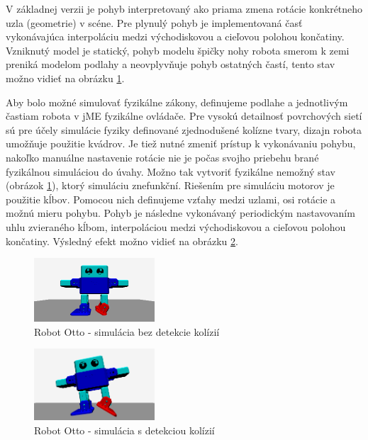 V základnej verzii je pohyb interpretovaný ako priama zmena rotácie konkrétneho uzla (geometrie) v scéne. Pre plynulý pohyb je implementovaná časť vykonávajúca interpoláciu medzi východiskovou a cieľovou polohou končatiny. Vzniknutý model je statický, pohyb modelu špičky nohy robota smerom k zemi preniká modelom podlahy a neovplyvňuje pohyb ostatných častí, tento stav možno vidieť na obrázku \ref{obr:otto-without-collision}.

Aby bolo možné simulovať fyzikálne zákony, definujeme podlahe a jednotlivým častiam robota v jME fyzikálne ovládače. Pre vysokú detailnosť povrchových sietí sú pre účely simulácie fyziky definované zjednodušené kolízne tvary, dizajn robota umožňuje použitie kvádrov. Je tiež nutné zmeniť prístup k vykonávaniu pohybu, nakoľko manuálne nastavenie rotácie nie je počas svojho priebehu brané fyzikálnou simuláciou do úvahy. Možno tak vytvoriť fyzikálne nemožný stav (obrázok \ref{obr:otto-without-collision}), ktorý simuláciu znefunkční. Riešením pre simuláciu motorov je použitie kĺbov. Pomocou nich definujeme vzťahy medzi uzlami, osi rotácie a možnú mieru pohybu. Pohyb je následne vykonávaný periodickým nastavovaním uhlu zvieraného kĺbom, interpoláciou medzi východiskovou a cieľovou polohou končatiny. Výsledný efekt možno vidieť na obrázku \ref{obr:otto-with-collision}.

\begin{figure}
\centerline{\includegraphics[width=0.4\textwidth]{images/otto-without-collision}}
\caption[Robot Otto - simulácia bez detekcie kolízií]{Robot Otto - simulácia bez detekcie kolízií}
\label{obr:otto-without-collision}
\end{figure}

\begin{figure}
\centerline{\includegraphics[width=0.4\textwidth]{images/otto-with-collision}}
\caption[Robot Otto - simulácia s detekciou kolízií]{Robot Otto - simulácia s detekciou kolízií}
\label{obr:otto-with-collision}
\end{figure}














